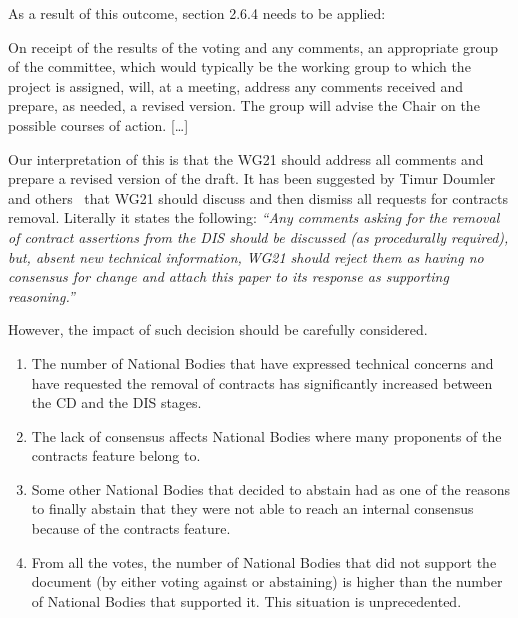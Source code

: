 As a result of this outcome, section 2.6.4 needs to be applied:

\vspace{1em}
\begin{tcolorbox}[
  colback=blue!8!white,
  colframe=blue,
  title={\textbf{Section 2.6.4 from ISO/IEC JTC1 Directives}},
  breakable,
  width=\textwidth,
  boxrule=0.5pt
  ]
On receipt of the results of the voting and any comments, an appropriate group
of the committee, which would typically be the working group to which the
project is assigned, will, at a meeting, address any comments received and
prepare, as needed, a revised version. The group will advise the Chair on the
possible courses of action. [\ldots]
\end{tcolorbox}

Our interpretation of this is that the WG21 should address all comments and
prepare a revised version of the draft. It has been suggested by Timur Doumler
and others~\cite{p4433r0} that WG21 should discuss and then dismiss all requests
for contracts removal. Literally it states the following: \emph{``Any comments
asking for the removal of contract assertions from the DIS should be discussed
(as procedurally required), but, absent new technical information, WG21 should
reject them as having no consensus for change and attach this paper to its
response as supporting reasoning.''}

However, the impact of such decision should be carefully considered.

\begin{enumerate}

\item
The number of National Bodies that have expressed technical concerns and have
requested the removal of contracts has significantly increased between the CD and the DIS
stages.

\item
The lack of consensus affects National Bodies where many proponents of the contracts feature belong to.

\item
Some other National Bodies that decided to abstain had as one of the reasons to
finally abstain that they were not able to reach an internal consensus because
of the contracts feature.

\item
From all the votes, the number of National Bodies that did not support the document (by either voting against or abstaining) is higher than the number of National Bodies that supported it. This situation is unprecedented.

\end{enumerate}
